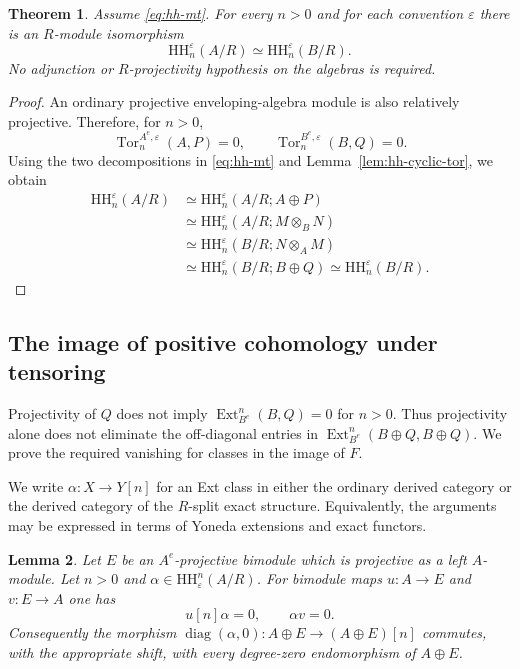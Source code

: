 \documentclass[12pt,a4paper,english,reqno]{amsart}
\numberwithin{equation}{section}
\theoremstyle{plain}
\newtheorem{theorem}{Theorem}[section]
\newtheorem{lemma}[theorem]{Lemma}
\theoremstyle{definition}
\begin{document}
\begin{theorem}\label{thm:hh-positive-homology}
Assume \eqref{eq:hh-mt}.  For every $n>0$ and for each convention
$\varepsilon$ there is an $R$-module isomorphism
\[
 \mathrm{HH}^{\varepsilon}_n(A/R)
       \simeq \mathrm{HH}^{\varepsilon}_n(B/R).
\]
No adjunction or $R$-projectivity hypothesis on the algebras is
required.
\end{theorem}

\begin{proof}
An ordinary projective enveloping-algebra module is also relatively
projective.  Therefore, for $n>0$,
\[
 \operatorname{Tor}^{A^e,\varepsilon}_n(A,P)=0,
 \qquad
 \operatorname{Tor}^{B^e,\varepsilon}_n(B,Q)=0.
\]
Using the two decompositions in \eqref{eq:hh-mt} and
Lemma~\ref{lem:hh-cyclic-tor}, we obtain
\begin{align*}
 \mathrm{HH}^{\varepsilon}_n(A/R)
 &\simeq \mathrm{HH}^{\varepsilon}_n(A/R;A\oplus P)\\
 &\simeq \mathrm{HH}^{\varepsilon}_n(A/R;M\otimes_BN)\\
 &\simeq \mathrm{HH}^{\varepsilon}_n(B/R;N\otimes_AM)\\
 &\simeq \mathrm{HH}^{\varepsilon}_n(B/R;B\oplus Q)
  \simeq \mathrm{HH}^{\varepsilon}_n(B/R).
\end{align*}
\end{proof}

\subsection{The image of positive cohomology under tensoring}

Projectivity of $Q$ does not imply
$\operatorname{Ext}_{B^e}^n(B,Q)=0$ for $n>0$.
Thus projectivity alone does not eliminate the off-diagonal entries in
$\operatorname{Ext}_{B^e}^n(B\oplus Q,B\oplus Q)$.
We prove the required vanishing for classes in the image of $F$.

We write $\alpha:X\to Y[n]$ for an Ext class in either
the ordinary derived category or the derived category of the
$R$-split exact structure.  Equivalently, the arguments may be expressed
in terms of Yoneda extensions and exact functors.

\begin{lemma}
\label{lem:hh-annihilation}
Let $E$ be an $A^e$-projective bimodule which is projective as a left
$A$-module.  Let $n>0$ and
$\alpha\in\mathrm{HH}_{\varepsilon}^{n}(A/R)$.
For bimodule maps $u:A\to E$ and $v:E\to A$ one has
\[
 u[n]\alpha=0,\qquad \alpha v=0.
\]
Consequently the morphism
$\operatorname{diag}(\alpha,0):A\oplus E\to(A\oplus E)[n]$
commutes, with the appropriate shift, with every degree-zero
endomorphism of $A\oplus E$.
\end{lemma}
\end{document}
